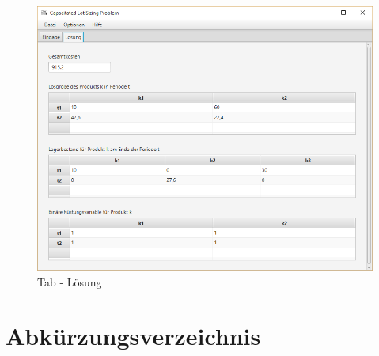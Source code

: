 \documentclass[12pt,a4paper, listof=entryprefix, bibliography=totocnumbered,toc=listofnumbered,lof=listofnumbered]{scrartcl}
\newcounter{verzeichnis}
\begin{document}
\begin{figure}[H]
	\centering
	\includegraphics[width=1.0\linewidth]{images/loesung.png} 
	\caption{Tab - Lösung}
	\label{fig:loesung}
\end{figure}

\pagebreak

%
	
	\listoffigures
	\pagebreak
	
	
	\section{Abkürzungsverzeichnis}
	\vspace{-6em} %
	\printnoidxglossary[type=\acronymtype,style=alttree,title=,toctitle=] %
\end{document}
